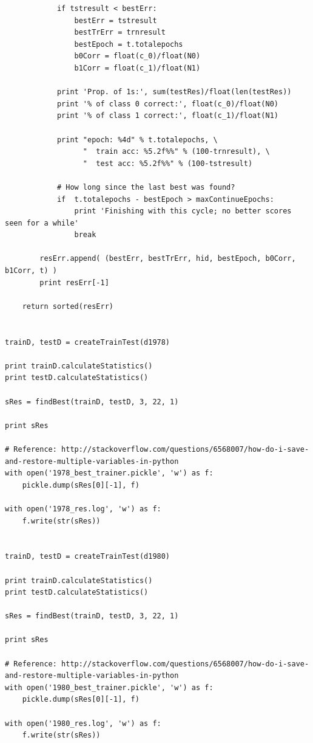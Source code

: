\documentclass[a4paper]{article}
\theoremstyle{plain}
\begin{document}
\begin{lstlisting}
            if tstresult < bestErr:
                bestErr = tstresult
                bestTrErr = trnresult
                bestEpoch = t.totalepochs  
                b0Corr = float(c_0)/float(N0)
                b1Corr = float(c_1)/float(N1)

            print 'Prop. of 1s:', sum(testRes)/float(len(testRes))
            print '% of class 0 correct:', float(c_0)/float(N0)
            print '% of class 1 correct:', float(c_1)/float(N1)

            print "epoch: %4d" % t.totalepochs, \
                  "  train acc: %5.2f%%" % (100-trnresult), \
                  "  test acc: %5.2f%%" % (100-tstresult)

            # How long since the last best was found?
            if  t.totalepochs - bestEpoch > maxContinueEpochs:
                print 'Finishing with this cycle; no better scores seen for a while' 
                break

        resErr.append( (bestErr, bestTrErr, hid, bestEpoch, b0Corr, b1Corr, t) )
        print resErr[-1]
    
    return sorted(resErr)


trainD, testD = createTrainTest(d1978)

print trainD.calculateStatistics()
print testD.calculateStatistics()

sRes = findBest(trainD, testD, 3, 22, 1)

print sRes

# Reference: http://stackoverflow.com/questions/6568007/how-do-i-save-and-restore-multiple-variables-in-python
with open('1978_best_trainer.pickle', 'w') as f:
    pickle.dump(sRes[0][-1], f)

with open('1978_res.log', 'w') as f:
    f.write(str(sRes))    
    
    
trainD, testD = createTrainTest(d1980)

print trainD.calculateStatistics()
print testD.calculateStatistics()

sRes = findBest(trainD, testD, 3, 22, 1)

print sRes

# Reference: http://stackoverflow.com/questions/6568007/how-do-i-save-and-restore-multiple-variables-in-python
with open('1980_best_trainer.pickle', 'w') as f:
    pickle.dump(sRes[0][-1], f)

with open('1980_res.log', 'w') as f:
    f.write(str(sRes))

\end{lstlisting}
\end{document}
